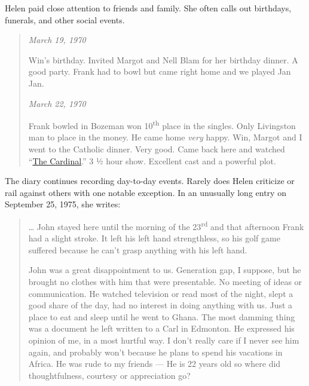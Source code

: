 Helen paid close attention to friends and family. She often calls out
birthdays, funerals, and other social events.

\begin{quote}
\emph{March 19, 1970}

Win's birthday. Invited Margot and Nell Blam for her birthday dinner. A
good party. Frank had to bowl but came right home and we played Jan Jan.

\emph{March 22, 1970}

Frank bowled in Bozeman won 10\textsuperscript{th} place in the singles.
Only Livingston man to place in the money. He came home \emph{very}
happy. Win, Margot and I went to the Catholic dinner. Very good. Came
back here and watched
``\href{https://en.wikipedia.org/wiki/The_Cardinal}{The Cardinal}.'' 3 ½
hour show. Excellent cast and a powerful plot.
\end{quote}

The diary continues recording day-to-day events. Rarely does Helen
criticize or rail against others with one notable exception. In an
unusually long entry on September 25, 1975, she writes:

\begin{quote}
\ldots{} John stayed here until the morning of the
23\textsuperscript{rd} and that afternoon Frank had a slight stroke. It
left his left hand strengthless, so his golf game suffered because he
can't grasp anything with his left hand.

John was a great disappointment to us. Generation gap, I suppose, but he
brought no clothes with him that were presentable. No meeting of ideas
or communication. He watched television or read most of the night, slept
a good share of the day, had no interest in doing anything with us. Just
a place to eat and sleep until he went to Ghana. The most damming thing
was a document he left written to a Carl in Edmonton. He expressed his
opinion of me, in a most hurtful way. I don't really care if I never see
him again, and probably won't because he plans to spend his vacations in
Africa. He was rude to my friends --- He is 22 years old so where
did thoughtfulness, courtesy or appreciation go?
\end{quote}

